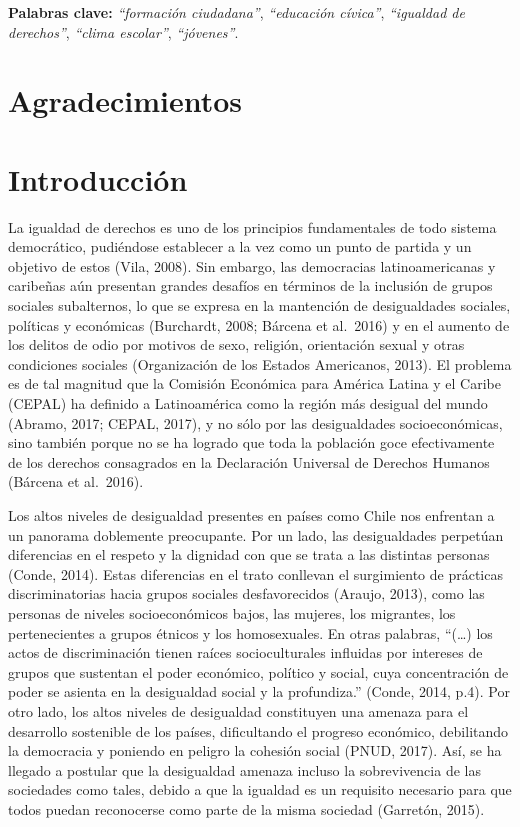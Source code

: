 \documentclass[12pt,twoside]{templates/facsothesis}
\begin{document}
\textbf{Palabras clave:} \emph{``formación ciudadana''}, \emph{``educación cívica''}, \emph{``igualdad de derechos''}, \emph{``clima escolar''}, \emph{``jóvenes''}.

\hypertarget{agradecimientos}{%
\chapter*{Agradecimientos}\label{agradecimientos}}

\hypertarget{introducciuxf3n}{%
\chapter{Introducción}\label{introducciuxf3n}}

La igualdad de derechos es uno de los principios fundamentales de todo sistema democrático, pudiéndose establecer a la vez como un punto de partida y un objetivo de estos (Vila, 2008). Sin embargo, las democracias latinoamericanas y caribeñas aún presentan grandes desafíos en términos de la inclusión de grupos sociales subalternos, lo que se expresa en la mantención de desigualdades sociales, políticas y económicas (Burchardt, 2008; Bárcena et al.~2016) y en el aumento de los delitos de odio por motivos de sexo, religión, orientación sexual y otras condiciones sociales (Organización de los Estados Americanos, 2013). El problema es de tal magnitud que la Comisión Económica para América Latina y el Caribe (CEPAL) ha definido a Latinoamérica como la región más desigual del mundo (Abramo, 2017; CEPAL, 2017), y no sólo por las desigualdades socioeconómicas, sino también porque no se ha logrado que toda la población goce efectivamente de los derechos consagrados en la Declaración Universal de Derechos Humanos (Bárcena et al.~2016).

Los altos niveles de desigualdad presentes en países como Chile nos enfrentan a un panorama doblemente preocupante. Por un lado, las desigualdades perpetúan diferencias en el respeto y la dignidad con que se trata a las distintas personas (Conde, 2014). Estas diferencias en el trato conllevan el surgimiento de prácticas discriminatorias hacia grupos sociales desfavorecidos (Araujo, 2013), como las personas de niveles socioeconómicos bajos, las mujeres, los migrantes, los pertenecientes a grupos étnicos y los homosexuales. En otras palabras, ``(\ldots) los actos de discriminación tienen raíces socioculturales influidas por intereses de grupos que sustentan el poder económico, político y social, cuya concentración de poder se asienta en la desigualdad social y la profundiza.'' (Conde, 2014, p.4). Por otro lado, los altos niveles de desigualdad constituyen una amenaza para el desarrollo sostenible de los países, dificultando el progreso económico, debilitando la democracia y poniendo en peligro la cohesión social (PNUD, 2017). Así, se ha llegado a postular que la desigualdad amenaza incluso la sobrevivencia de las sociedades como tales, debido a que la igualdad es un requisito necesario para que todos puedan reconocerse como parte de la misma sociedad (Garretón, 2015).
\end{document}
